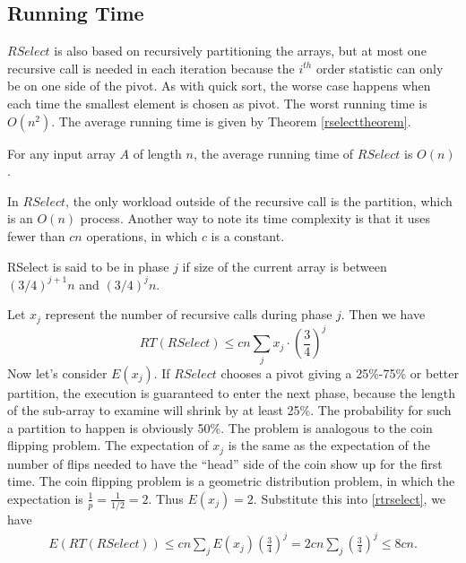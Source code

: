 \subsection{Running Time}
$RSelect$ is also based on recursively partitioning the arrays, but at most one recursive call is needed in each iteration because the $i^{th}$ order statistic can only be on one side of the pivot. As with quick sort, the worse case happens when each time the smallest element is chosen as pivot. The worst running time is $O(n^2)$. The average running time is given by Theorem \ref{rselecttheorem}.
\begin{theorem}\label{rselecttheorem}
For any input array $A$ of length $n$, the average running time of $RSelect$ is $O(n)$.
\end{theorem}
In $RSelect$, the only workload outside of the recursive call is the partition, which is an $O(n)$ process. Another way to note its time complexity is that it uses fewer than $cn$ operations, in which $c$ is a constant. 
\begin{definition}
RSelect is said to be in phase $j$ if size of the current array is between $(3/4)^{j+1}n$ and $(3/4)^jn$.
\end{definition}
Let $x_j$ represent the number of recursive calls during phase $j$. Then we have
\begin{equation}\label{rtrselect}
RT(RSelect)\leq cn\sum\limits_jx_j\cdot\left(\frac{3}{4}\right)^j
\end{equation}
Now let's consider $E(x_j)$. If $RSelect$ chooses a pivot giving a 25\%-75\% or better partition, the execution is guaranteed to enter the next phase, because the length of the sub-array to examine will shrink by at least 25\%. The probability for such a partition to happen is obviously 50\%. The problem is analogous to the coin flipping problem. The expectation of $x_j$ is the same as the expectation of the number of flips needed to have the ``head'' side of the coin show up for the first time. The coin flipping problem is a geometric distribution problem, in which the expectation is $\frac{1}{p}=\frac{1}{1/2}=2$. Thus $E(x_j)=2$. Substitute this into \eqref{rtrselect}, we have
\begin{align*}
E(RT(RSelect))\leq cn\sum\limits_jE(x_j)\left(\frac{3}{4}\right)^j=2cn\sum\limits_j\left(\frac{3}{4}\right)^j\leq8cn.
\end{align*}
